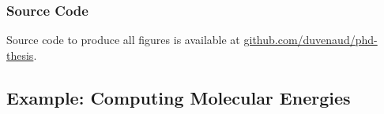 \subsubsection{Source Code}
Source code to produce all figures is available at \url{github.com/duvenaud/phd-thesis}.






\outbpdocument{


}



\iffalse


\subsection{Example: Computing Molecular Energies}


